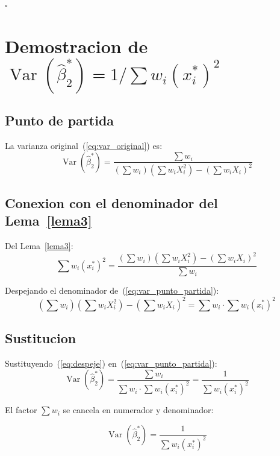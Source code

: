 \documentclass[12pt, letterpaper]{article}
\theoremstyle{remark}
\newcommand{\Var}{\operatorname{Var}}
\newcommand{\sw}{\sum w_i}
\newcommand{\swx}{\sum w_i X_i}
\newcommand{\swxx}{\sum w_i X_i^2}
\newcommand{\xstar}{x_i^*}
\begin{document}
\hfill$\square$

\section{Demostracion de \texorpdfstring{$\Var(\hat\beta_2^*) = 1/\sum w_i(\xstar)^2$}{var(beta2*)}}

\subsection{Punto de partida}

La varianza original~(\ref{eq:var_original}) es:
\begin{equation}
  \Var(\hat\beta_2^*) = \frac{\sw}{(\sw)(\swxx) - (\swx)^2}
  \label{eq:var_punto_partida}
\end{equation}

\subsection{Conexion con el denominador del Lema~\ref{lema3}}

Del Lema~\ref{lema3}:
\begin{equation}
  \sum w_i(\xstar)^2 = \frac{(\sw)(\swxx) - (\swx)^2}{\sw}
  \label{eq:lema3_rep}
\end{equation}

Despejando el denominador de~(\ref{eq:var_punto_partida}):
\begin{equation}
  (\sw)(\swxx) - (\swx)^2 = \sw \cdot \sum w_i(\xstar)^2
  \label{eq:despeje}
\end{equation}

\subsection{Sustitucion}

Sustituyendo~(\ref{eq:despeje}) en~(\ref{eq:var_punto_partida}):
\begin{equation}
  \Var(\hat\beta_2^*)
    = \frac{\sw}{\sw \cdot \sum w_i(\xstar)^2}
    = \frac{1}{\sum w_i(\xstar)^2}
  \label{eq:var_final}
\end{equation}

El factor $\sw$ se cancela en numerador y denominador:

\begin{equation}
  \boxed{
    \Var(\hat\beta_2^*) = \frac{1}{\sum w_i(\xstar)^2}
  }
  \label{eq:var_demostrada}
\end{equation}
\end{document}
